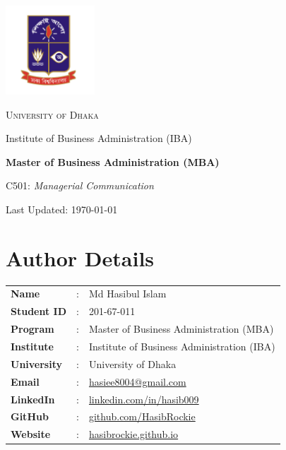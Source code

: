 \documentclass[12pt,a4paper]{book}
\begin{document}
\begin{titlepage}
    \centering
    \vspace*{3.5cm}
    \includegraphics[width=0.25\textwidth]{logo.png}\par\vspace{1cm}
    {\scshape\Huge University of Dhaka\par}
    \vspace{0.5cm}
    {\Large Institute of Business Administration (IBA)\par}
    \vspace{1.5cm}
    {\Huge\bfseries Master of Business Administration (MBA)\par}
    \vspace{1cm}
    {\Large C501: \textit{Managerial Communication}\par}
    \vfill
    {\large Last Updated: \today\par}
\end{titlepage}

\section*{Author Details}
{}

\begin{center}
    \vspace{1em}
    \begin{tabular}{lll}
        \textbf{Name} & : & Md Hasibul Islam \\[0.5em]
        \textbf{Student ID} & : & 201-67-011 \\[0.5em]
        \textbf{Program} & : & Master of Business Administration (MBA) \\[0.5em]
        \textbf{Institute} & : & Institute of Business Administration (IBA) \\[0.5em]
        \textbf{University} & : & University of Dhaka \\[0.5em]
        \textbf{Email} & : & \href{mailto:hasiee8004@gmail.com}{hasiee8004@gmail.com} \\[0.5em]
        \textbf{LinkedIn} & : & \href{https://www.linkedin.com/in/hasib009}{linkedin.com/in/hasib009} \\[0.5em]
        \textbf{GitHub} & : & \href{https://github.com/HasibRockie}{github.com/HasibRockie} \\[0.5em]
        \textbf{Website} & : & \href{https://hasibrockie.github.io}{hasibrockie.github.io} \\
    \end{tabular}
    \vspace{1em}
\end{center}
\end{document}
